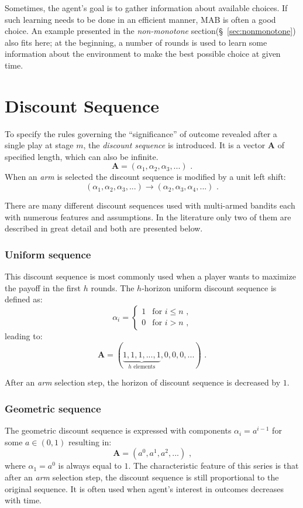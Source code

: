 \documentclass[12pt, a4paper, pdflatex, leqno, twoside]{report}
\begin{document}
Sometimes, the agent's goal is to gather information about available choices. If such learning needs to be done in an 
efficient manner, MAB is often a good choice. An example presented in the \emph{non-monotone} section(\S~\ref{sec:nonmonotone}) also fits here; at the beginning, a number of rounds is used to learn 
some information about the environment to make the best possible choice at given time. 
\\

\section{Discount Sequence}
To specify the rules governing the ``significance'' of outcome revealed after a single 
play at stage $m$, the \emph{discount sequence} is introduced. It is a vector 
$\mathbf{A}$ of specified length, which can also be infinite.
$$
\mathbf{A} = \left( \alpha_1, \alpha_2, \alpha_3, ... \right) \text{ .}
$$
When an \emph{arm} is selected the discount sequence is modified by a unit left shift:
$$
\left( \alpha_1, \alpha_2, \alpha_3, ... \right)
\rightarrow
\left( \alpha_2, \alpha_3, \alpha_4, ... \right) \text{ .}
$$

There are many different discount sequences used with multi-armed bandits each 
with numerous features and assumptions. In the literature only two of them are described in 
great detail and both are presented below.

\subsubsection{Uniform sequence}
This discount sequence is most commonly used when a player wants to maximize 
the payoff in the first $h$ rounds.
The $h$-horizon uniform discount sequence is defined as:
$$
 \alpha_i =
  \begin{cases}
   1 & \text{for } i \leq n \text{ ,}\\
   0 & \text{for } i > n \text{ ,}
  \end{cases}
$$
leading to:
$$
  \mathbf{A} = ( \underbrace{ 1, 1, 1, ..., 1}_{h\text{ elements}}, 0, 0, 0, 
... ) \text{ .}
$$

After an \emph{arm} selection step, the horizon of discount sequence is decreased by $1$.


\subsubsection{Geometric sequence}
The geometric discount sequence is expressed with components $\alpha_i = a^{i-
1}$ for some $a \in ( 0, 1 )$ resulting in:
$$
\mathbf{A} = \left( a^0, a^1, a^2, ... \right) \text{ ,}
$$
where $\alpha_1 = a^0$ is always equal to $1$. The characteristic feature of 
this series is that after an \emph{arm} selection step, the discount sequence is still 
proportional to the original sequence. It is often used when agent's interest in outcomes decreases with time.\\
\end{document}
